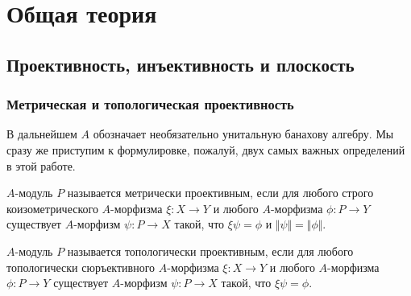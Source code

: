 \chapter{Общая теория}\label{ChapterGeneralTheory} 


\section{
    Проективность, инъективность и плоскость
}\label{
    SectionProjectivityInjectivityAndFlatness
}



\subsection{
    Метрическая и топологическая проективность
}\label{
    SubSectionMetricAndTopologicalProjectivity
}

В дальнейшем $A$ обозначает необязательно унитальную банахову алгебру. Мы сразу
же приступим к формулировке, пожалуй, двух самых важных определений в этой
работе.

\begin{definition}\label{MetProjMod}
$A$-модуль $P$ называется метрически проективным, если для любого строго
коизометрического $A$-морфизма $\xi:X\to Y$ и любого $A$-морфизма $\phi:P\to Y$
существует $A$-морфизм $\psi:P\to X$ такой, что $\xi\psi=\phi$ и
$\Vert\psi\Vert=\Vert\phi\Vert$.
\end{definition}

\begin{definition}\label{TopProjMod}
$A$-модуль $P$ называется топологически проективным, если для любого
топологически сюръективного $A$-морфизма $\xi:X\to Y$ и любого $A$-морфизма
$\phi:P\to Y$ существует $A$-морфизм $\psi:P\to X$ такой, что $\xi\psi=\phi$.
\end{definition}

